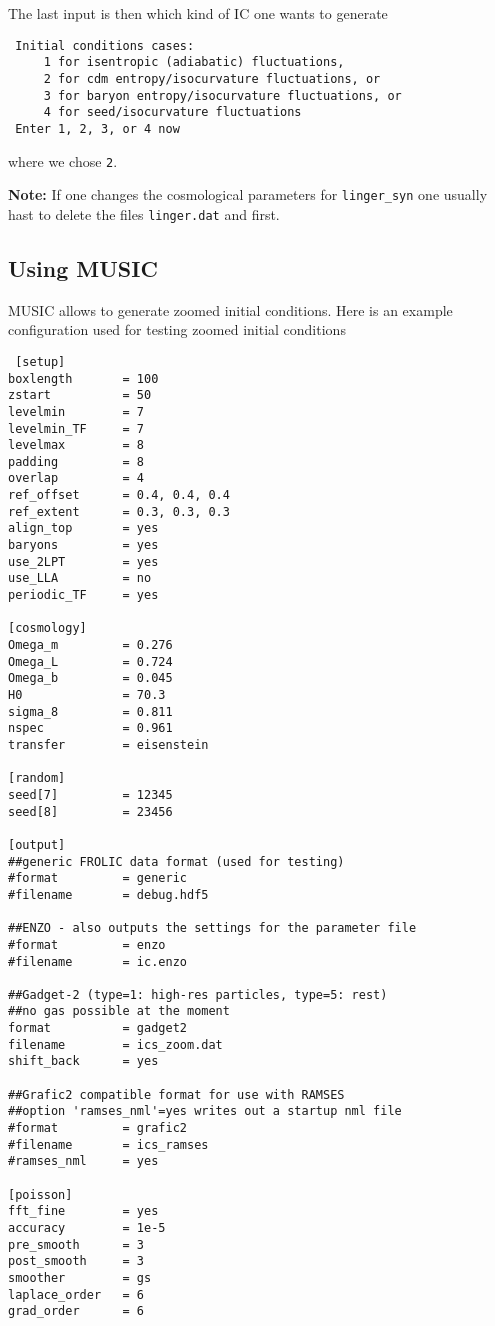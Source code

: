 \documentclass[a4paper,english,10.5pt]{scrartcl}
\begin{document}
\begin{description}
The last input is then which kind of IC one wants to generate 
\begin{verbatim}
 Initial conditions cases:
     1 for isentropic (adiabatic) fluctuations,
     2 for cdm entropy/isocurvature fluctuations, or
     3 for baryon entropy/isocurvature fluctuations, or
     4 for seed/isocurvature fluctuations
 Enter 1, 2, 3, or 4 now
\end{verbatim}
where we chose \texttt{2}. 

\textbf{Note: } If one changes the cosmological parameters for 
\texttt{linger\_syn} one usually hast to delete the files \texttt{linger.dat} 
and  first. 

\end{description}

\subsection{Using MUSIC}
MUSIC allows to generate zoomed initial conditions. Here is an example configuration used for testing zoomed initial conditions
\begin{verbatim}
 [setup]
boxlength		= 100
zstart			= 50
levelmin		= 7
levelmin_TF		= 7
levelmax		= 8
padding			= 8 
overlap			= 4
ref_offset		= 0.4, 0.4, 0.4
ref_extent		= 0.3, 0.3, 0.3
align_top		= yes
baryons			= yes
use_2LPT		= yes
use_LLA			= no
periodic_TF		= yes

[cosmology]
Omega_m			= 0.276
Omega_L			= 0.724
Omega_b			= 0.045
H0				= 70.3
sigma_8			= 0.811
nspec			= 0.961
transfer		= eisenstein

[random]
seed[7]			= 12345
seed[8]			= 23456

[output]
##generic FROLIC data format (used for testing)
#format			= generic
#filename		= debug.hdf5

##ENZO - also outputs the settings for the parameter file
#format			= enzo
#filename		= ic.enzo

##Gadget-2 (type=1: high-res particles, type=5: rest)
##no gas possible at the moment
format			= gadget2
filename		= ics_zoom.dat
shift_back      = yes

##Grafic2 compatible format for use with RAMSES
##option 'ramses_nml'=yes writes out a startup nml file
#format			= grafic2	
#filename		= ics_ramses
#ramses_nml     = yes

[poisson]
fft_fine		= yes
accuracy		= 1e-5
pre_smooth		= 3
post_smooth		= 3
smoother		= gs
laplace_order	= 6
grad_order		= 6


\end{verbatim}
\end{document}
